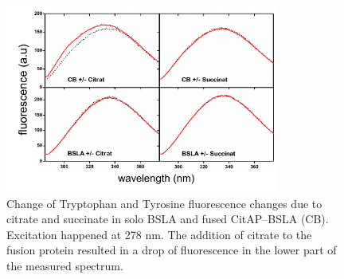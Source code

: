 \documentclass[english, a4paper, 12pt, titlepage, draft]{article}
\begin{document}
 

\begin{figure}
    \centering
    \includegraphics[width=0.8\textwidth]{figures/TyrTrp/TyrTrp_experiment.pdf}
    \caption{Change of Tryptophan and Tyrosine fluorescence changes due to citrate and succinate in solo BSLA and fused CitAP--BSLA (CB).
        Excitation happened at 278 nm.
        The addition of citrate to the fusion protein resulted in a drop of fluorescence in the lower part of the measured spectrum.}
    \label{fig:TyrTrp_fluorescence}
\end{figure}        
\end{document}
